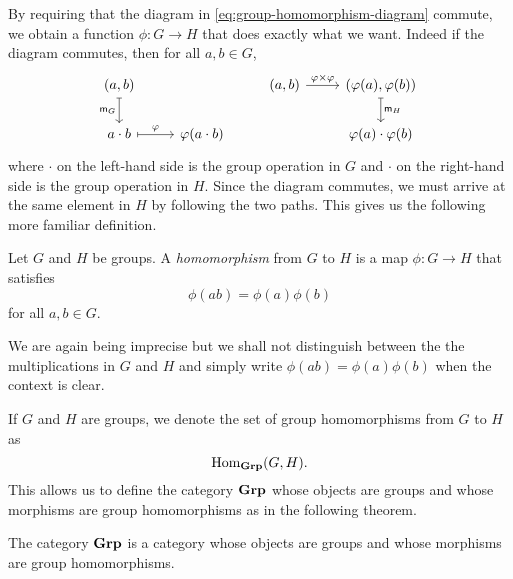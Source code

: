 By requiring that the diagram in \eqref{eq:group-homomorphism-diagram} commute,
we obtain a function \(\phi: G \to H\) that does exactly what we want. Indeed if
the diagram commutes, then for all \(a, b \in G\),
\[
    \begin{tikzcd}
        (a, b) \arrow[swap, mapsto]{d}{\mult_G} & & (a, b) \arrow{r}{\phi \times \phi} & (\phi(a), \phi(b)) \arrow[mapsto]{d}{\mult_H} \\
        a\cdot b \arrow[mapsto]{r}{\phi} & \phi(a\cdot b) && \phi(a)\cdot\phi(b)
    \end{tikzcd}
\]
where \(\cdot\) on the left-hand side is the group operation in \(G\) and
\(\cdot\) on the right-hand side is the group operation in \(H\). Since the
diagram commutes, we must arrive at the same element in \(H\) by following the
two paths. This gives us the following more familiar definition.

\begin{definition}
    Let \(G\) and \(H\) be groups. A \emph{homomorphism} from \(G\) to \(H\) is
    a map \(\phi: G \to H\) that satisfies
    \[
        \phi(ab) = \phi(a)\phi(b)
    \]
    for all \(a, b \in G\).
\end{definition}

We are again being imprecise but we shall not distinguish between the the
multiplications in \(G\) and \(H\) and simply write \(\phi(ab) =
\phi(a)\phi(b)\) when the context is clear.

If \(G\) and \(H\) are groups, we denote the set of group homomorphisms from
\(G\) to \(H\) as
\[
    \operatorname{Hom}_{\mathbf{Grp}}(G, H).
\]
This allows us to define the category \(\mathbf{Grp}\) whose objects are groups and
whose morphisms are group homomorphisms as in the following theorem.

\begin{theorem}
    The category \(\mathbf{Grp}\) is a category whose objects are groups and whose
    morphisms are group homomorphisms.
\end{theorem}

